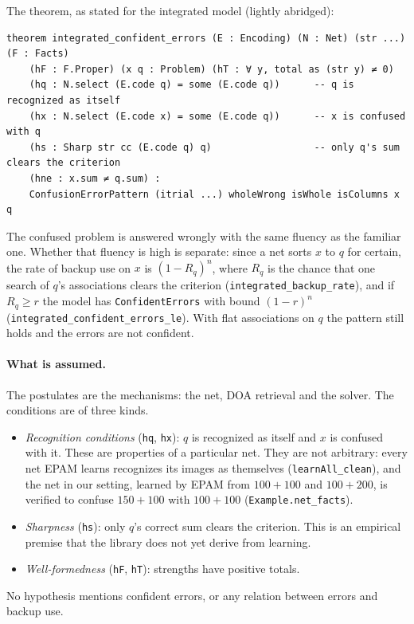 \documentclass[11pt]{article}
\newcommand{\code}[1]{\texttt{#1}}
\newcommand{\lean}[1]{\texttt{#1}}
\begin{document}
The theorem, as stated for the integrated model (lightly abridged):
\begin{Verbatim}[fontsize=\small]
theorem integrated_confident_errors (E : Encoding) (N : Net) (str ...) (F : Facts)
    (hF : F.Proper) (x q : Problem) (hT : ∀ y, total as (str y) ≠ 0)
    (hq : N.select (E.code q) = some (E.code q))      -- q is recognized as itself
    (hx : N.select (E.code x) = some (E.code q))      -- x is confused with q
    (hs : Sharp str cc (E.code q) q)                  -- only q's sum clears the criterion
    (hne : x.sum ≠ q.sum) :
    ConfusionErrorPattern (itrial ...) wholeWrong isWhole isColumns x q
\end{Verbatim}
The confused problem is answered wrongly with the same fluency as the familiar one. Whether that fluency is high is separate: since a net sorts $x$ to $q$ for certain, the rate of backup use on $x$ is $(1-R_q)^n$, where $R_q$ is the chance that one search of $q$'s associations clears the criterion (\lean{integrated\_backup\_rate}), and if $R_q \ge r$ the model has \lean{ConfidentErrors} with bound $(1-r)^n$ (\lean{integrated\_confident\_errors\_le}). With flat associations on $q$ the pattern still holds and the errors are not confident.

\paragraph{What is assumed.} The postulates are the mechanisms: the net, DOA retrieval and the solver. The conditions are of three kinds.
\begin{itemize}
  \item \emph{Recognition conditions} (\code{hq}, \code{hx}): $q$ is recognized as itself and $x$ is confused with it. These are properties of a particular net. They are not arbitrary: every net EPAM learns recognizes its images as themselves (\lean{learnAll\_clean}), and the net in our setting, learned by EPAM from $100+100$ and $100+200$, is verified to confuse $150+100$ with $100+100$ (\lean{Example.net\_facts}).
  \item \emph{Sharpness} (\code{hs}): only $q$'s correct sum clears the criterion. This is an empirical premise that the library does not yet derive from learning.
  \item \emph{Well-formedness} (\code{hF}, \code{hT}): strengths have positive totals.
\end{itemize}
No hypothesis mentions confident errors, or any relation between errors and backup use.
\end{document}
